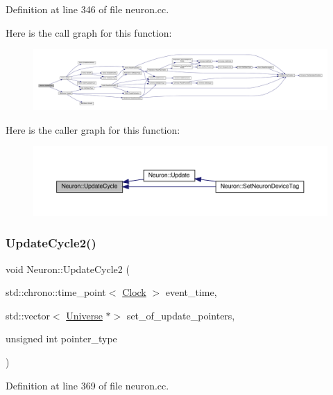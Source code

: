 Definition at line 346 of file neuron.\+cc.

Here is the call graph for this function\+:
\nopagebreak
\begin{figure}[H]
\begin{center}
\leavevmode
\includegraphics[width=350pt]{class_neuron_a06f45a5d1de890da84d3644fe58ea0a9_cgraph}
\end{center}
\end{figure}
Here is the caller graph for this function\+:
\nopagebreak
\begin{figure}[H]
\begin{center}
\leavevmode
\includegraphics[width=350pt]{class_neuron_a06f45a5d1de890da84d3644fe58ea0a9_icgraph}
\end{center}
\end{figure}
\mbox{\label{class_neuron_a55c72e8066caf1ad8e25a2b0b453ee69}} 
\subsubsection{\texorpdfstring{Update\+Cycle2()}{UpdateCycle2()}}
{\footnotesize\ttfamily void Neuron\+::\+Update\+Cycle2 (\begin{DoxyParamCaption}\item[{std\+::chrono\+::time\+\_\+point$<$ \hyperlink{universe_8h_a0ef8d951d1ca5ab3cfaf7ab4c7a6fd80}{Clock} $>$}]{event\+\_\+time,  }\item[{std\+::vector$<$ \hyperlink{class_universe}{Universe} $\ast$$>$}]{set\+\_\+of\+\_\+update\+\_\+pointers,  }\item[{unsigned int}]{pointer\+\_\+type }\end{DoxyParamCaption})}



Definition at line 369 of file neuron.\+cc.

